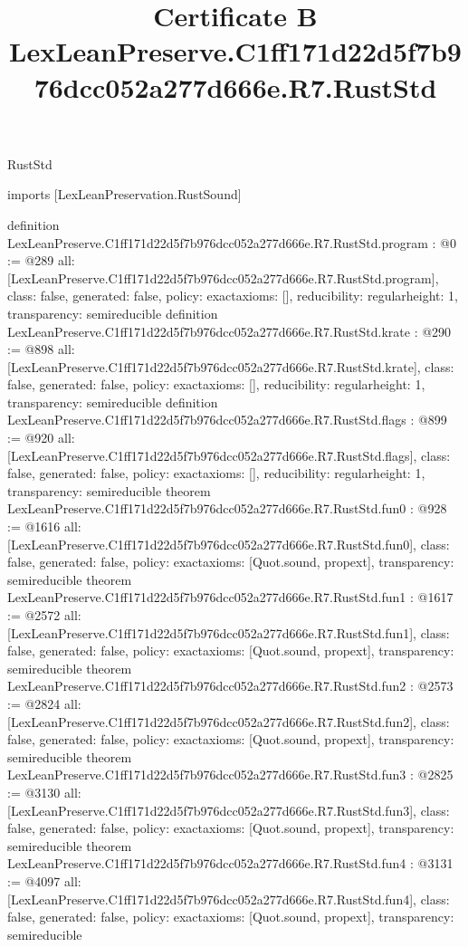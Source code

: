 \begin{lexlean}{RustStd}
\title{Certificate B LexLeanPreserve.C1ff171d22d5f7b976dcc052a277d666e.R7.RustStd}
\begin{coremodule}
imports [LexLeanPreservation.RustSound]

definition LexLeanPreserve.C1ff171d22d5f7b976dcc052a277d666e.R7.RustStd.program : @0 := @289 {
  all: [LexLeanPreserve.C1ff171d22d5f7b976dcc052a277d666e.R7.RustStd.program],
  class: false,
  generated: false,
  policy: exact{axioms: []},
  reducibility: regular{height: 1},
  transparency: semireducible
}
definition LexLeanPreserve.C1ff171d22d5f7b976dcc052a277d666e.R7.RustStd.krate : @290 := @898 {
  all: [LexLeanPreserve.C1ff171d22d5f7b976dcc052a277d666e.R7.RustStd.krate],
  class: false,
  generated: false,
  policy: exact{axioms: []},
  reducibility: regular{height: 1},
  transparency: semireducible
}
definition LexLeanPreserve.C1ff171d22d5f7b976dcc052a277d666e.R7.RustStd.flags : @899 := @920 {
  all: [LexLeanPreserve.C1ff171d22d5f7b976dcc052a277d666e.R7.RustStd.flags],
  class: false,
  generated: false,
  policy: exact{axioms: []},
  reducibility: regular{height: 1},
  transparency: semireducible
}
theorem LexLeanPreserve.C1ff171d22d5f7b976dcc052a277d666e.R7.RustStd.fun0 : @928 := @1616 {
  all: [LexLeanPreserve.C1ff171d22d5f7b976dcc052a277d666e.R7.RustStd.fun0],
  class: false,
  generated: false,
  policy: exact{axioms: [Quot.sound, propext]},
  transparency: semireducible
}
theorem LexLeanPreserve.C1ff171d22d5f7b976dcc052a277d666e.R7.RustStd.fun1 : @1617 := @2572 {
  all: [LexLeanPreserve.C1ff171d22d5f7b976dcc052a277d666e.R7.RustStd.fun1],
  class: false,
  generated: false,
  policy: exact{axioms: [Quot.sound, propext]},
  transparency: semireducible
}
theorem LexLeanPreserve.C1ff171d22d5f7b976dcc052a277d666e.R7.RustStd.fun2 : @2573 := @2824 {
  all: [LexLeanPreserve.C1ff171d22d5f7b976dcc052a277d666e.R7.RustStd.fun2],
  class: false,
  generated: false,
  policy: exact{axioms: [Quot.sound, propext]},
  transparency: semireducible
}
theorem LexLeanPreserve.C1ff171d22d5f7b976dcc052a277d666e.R7.RustStd.fun3 : @2825 := @3130 {
  all: [LexLeanPreserve.C1ff171d22d5f7b976dcc052a277d666e.R7.RustStd.fun3],
  class: false,
  generated: false,
  policy: exact{axioms: [Quot.sound, propext]},
  transparency: semireducible
}
theorem LexLeanPreserve.C1ff171d22d5f7b976dcc052a277d666e.R7.RustStd.fun4 : @3131 := @4097 {
  all: [LexLeanPreserve.C1ff171d22d5f7b976dcc052a277d666e.R7.RustStd.fun4],
  class: false,
  generated: false,
  policy: exact{axioms: [Quot.sound, propext]},
  transparency: semireducible
}
\end{coremodule}
\end{lexlean}
